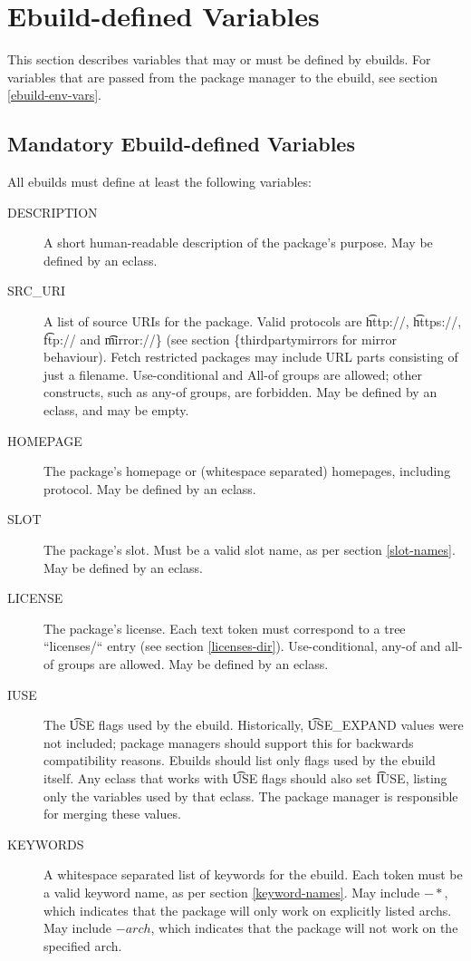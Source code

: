 \chapter{Ebuild-defined Variables}
\label{ebuild-vars}

\note This section describes variables that may or must be defined by ebuilds. For
variables that are passed from the package manager to the ebuild, see section \ref{ebuild-env-vars}.

\section{Mandatory Ebuild-defined Variables}

All ebuilds must define at least the following variables:

\begin{description}
\item[DESCRIPTION] A short human-readable description of the package's purpose. May be defined by an
    eclass.
\item[SRC\_URI] A list of source URIs for the package. Valid protocols are \t{http://},
    \t{https://}, \t{ftp://} and \t{mirror://\} (see section \{thirdpartymirrors} for mirror behaviour).
    Fetch restricted packages may include URL parts consisting of just a filename.  Use-conditional and
    All-of groups are allowed; other constructs, such as any-of groups, are forbidden. May be defined by
    an eclass, and may be empty.
\item[HOMEPAGE] The package's homepage or (whitespace separated) homepages, including protocol. May
    be defined by an eclass.
\item[SLOT] The package's slot. Must be a valid slot name, as per section \ref{slot-names}. May
    be defined by an eclass.
\item[LICENSE] The package's license. Each text token must correspond to a tree ``licenses/`` entry
    (see section \ref{licenses-dir}). Use-conditional, any-of and all-of groups are allowed.
    May be defined by an eclass.
\item[IUSE] The \t{USE} flags used by the ebuild. Historically, \t{USE\_EXPAND} values were not
    included; package managers should support this for backwards compatibility reasons. Ebuilds
    should list only flags used by the ebuild itself. Any eclass that works with \t{USE} flags
    should also set \t{IUSE}, listing only the variables used by that eclass. The package manager is
    responsible for merging these values.
\item[KEYWORDS] A whitespace separated list of keywords for the ebuild. Each token must be a
    valid keyword name, as per section \ref{keyword-names}. May include $-*$, which
    indicates that the package will only work on explicitly listed archs. May include $-arch$,
    which indicates that the package will not work on the specified arch.
\end{description}

